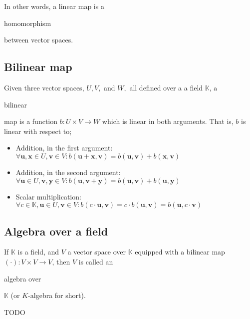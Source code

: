 \documentclass{article}
\newenvironment{itemized}{ 
\begin{itemize}
\setlength{\itemsep}{0pt}
\setlength{\parskip}{0pt}
\setlength{\parsep}{0pt}     
}{\end{itemize}}
\renewcommand{\vec}[1]{\mathbf{#1}}
\begin{document}
In other words, a linear map is a \begin{em}homomorphism\end{em} between vector spaces.

\subsection*{Bilinear map}

Given three vector spaces, $U, V, $ and $W,$ all defined over a a field $\mathbb{K}$, a \begin{em}bilinear\end{em} map is a function $b : U \times V \rightarrow W$ which is linear in both arguments. That is, $b$ is linear with respect to;

  \begin{itemized}
    \item Addition, in the first argument: $ \forall \vec{u}, \vec{x} \in U, \vec{v} \in V : b(\vec{u} + \vec{x}, \vec{v}) = b(\vec{u}, \vec{v}) + b(\vec{x}, \vec{v}) $
    \item Addition, in the second argument: $ \forall \vec{u} \in U, \vec{v}, \vec{y} \in V : b(\vec{u}, \vec{v} + \vec{y}) = b(\vec{u}, \vec{v}) + b(\vec{u}, \vec{y}) $
    \item Scalar multiplication: $ \forall c \in \mathbb{K}, \vec{u} \in U, \vec{v} \in V : b(c \cdot \vec{u}, \vec{v}) = c \cdot b(\vec{u}, \vec{v}) = b(\vec{u}, c \cdot \vec{v}) $
  \end{itemized}

\subsection*{Algebra over a field}

If $\mathbb{K}$ is a field, and $V$ a vector space over $\mathbb{K}$ equipped with a bilinear map $(\cdot) : V \times V \rightarrow V$, then $V$ is called an \begin{em}algebra over\end{em} $\mathbb{K}$ (or $K$-algebra for short).

  TODO
\end{document}

